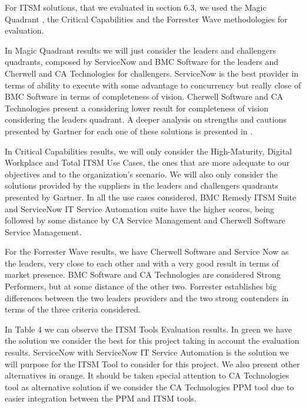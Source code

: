 For ITSM solutions, that we evaluated in section 6.3, we used the Magic Quadrant , the Critical Capabilities and the Forrester Wave methodologies for evaluation.\par
In Magic Quadrant results we will just consider the leaders and challengers quadrants, composed by ServiceNow and BMC Software for the leaders and Cherwell and CA Technologies for challengers. ServiceNow is the best provider in terms of ability to execute with some advantage to concurrency but really close of BMC Software in terms of completeness of vision. Cherwell Software and CA Technologies present a considering lower result for completeness of vision considering the leaders quadrant. A deeper analysis on strengths and cautions presented by Gartner for each one of these solutions is presented in \cite{magicQuadrantITSM}.\par
In Critical Capabilities results, we will only consider the High-Maturity, Digital Workplace and Total ITSM Use Cases, the ones that are more adequate to our objectives and to the organization's scenario. We will also only consider the solutions provided by the suppliers in the leaders and challengers quadrants presented by Gartner. In all the use cases considered, BMC Remedy ITSM Suite and ServiceNow IT Service Automation suite have the higher scores, being followed by some distance by CA Service Management and Cherwell Software Service Management.\par
For the Forrester Wave results, we have Cherwell Software and Service Now as the leaders, very close to each other and with a very good result in terms of market presence. BMC Software and CA Technologies are considered Strong Performers, but at some distance of the other two. Forrester establishes big differences between the two leaders providers and the two strong contenders in terms of the three criteria considered.\par
In Table 4 we can observe the ITSM Tools Evaluation results. In green we have the solution we consider the best for this project taking in account the evaluation results. ServiceNow with ServiceNow IT Service Automation is the solution we will purpose for the ITSM Tool to consider for this project. We also present other alternatives in orange. It should be taken special attention to CA Technologies tool as alternative solution if we consider the CA Technologies PPM tool due to easier integration between the PPM and ITSM tools.\par


